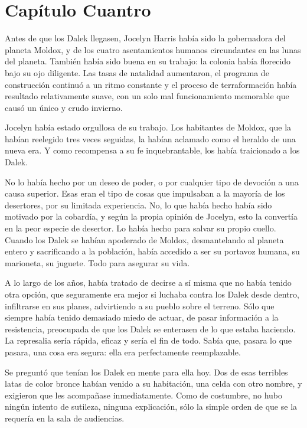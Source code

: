 \chapter*{Capítulo Cuantro}

Antes de que los Dalek llegasen, Jocelyn Harris había sido la gobernadora del planeta Moldox, y de los cuatro asentamientos humanos circundantes en las lunas del planeta. También había sido buena en su trabajo: la colonia había florecido bajo su ojo diligente. Las tasas de natalidad aumentaron, el programa de construcción continuó a un ritmo constante y el proceso de terraformación había resultado relativamente suave, con un solo mal funcionamiento memorable que causó un único y crudo invierno. 

Jocelyn había estado orgullosa de su trabajo. Los habitantes de Moldox, que la habían reelegido tres veces seguidas, la habían aclamado como el heraldo de una nueva era. Y como recompensa a su fe inquebrantable, los había traicionado a los Dalek. 

No lo había hecho por un deseo de poder, o por cualquier tipo de devoción a una causa superior. Esas eran el tipo de cosas que impulsaban a la mayoría de los desertores, por su limitada experiencia. No, lo que había hecho había sido motivado por la cobardía, y según la propia opinión de Jocelyn, esto la convertía en la peor especie de desertor. Lo había hecho para salvar su propio cuello. Cuando los Dalek se habían apoderado de Moldox, desmantelando al planeta entero y sacrificando a la población, había accedido a ser su portavoz humana, su marioneta, su juguete. Todo para asegurar su vida. 

A lo largo de los años, había tratado de decirse a sí misma que no había tenido otra opción, que seguramente era mejor si luchaba contra los Dalek desde dentro, infiltrarse en sus planes, advirtiendo a su pueblo sobre el terreno. Sólo que siempre había tenido demasiado miedo de actuar, de pasar información a la resistencia, preocupada de que los Dalek se enterasen de lo que estaba haciendo. La represalia sería rápida, eficaz y sería el fin de todo. Sabía que, pasara lo que pasara, una cosa era segura: ella era perfectamente reemplazable. 

Se preguntó que tenían los Dalek en mente para ella hoy. Dos de esas terribles latas de color bronce habían venido a su habitación, una celda con otro nombre, y exigieron que les acompañase inmediatamente. Como de costumbre, no hubo ningún intento de sutileza, ninguna explicación, sólo la simple orden de que se la requería en la sala de audiencias. 

